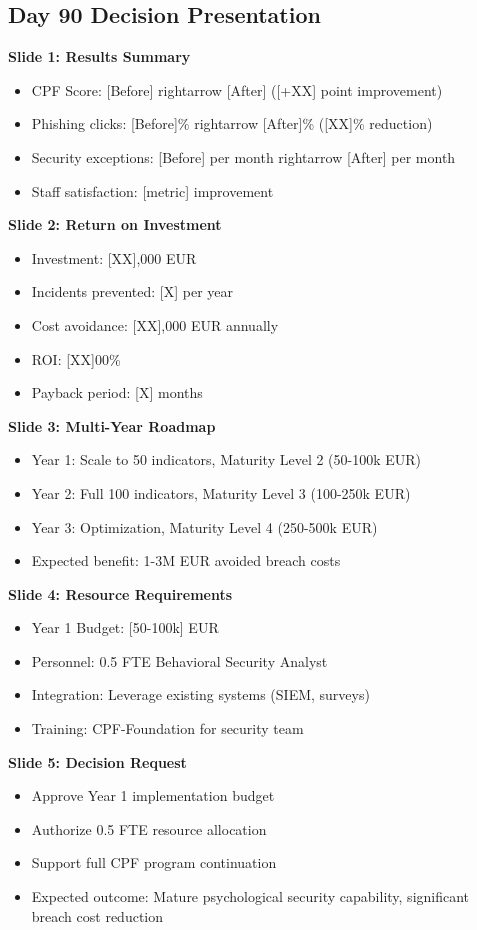 \documentclass[11pt,a4paper]{article}
\begin{document}
\subsection{Day 90 Decision Presentation}

\textbf{Slide 1: Results Summary}
\begin{itemize}
\item CPF Score: [Before] rightarrow [After] ([+XX] point improvement)
\item Phishing clicks: [Before]\% rightarrow [After]\% ([XX]\% reduction)
\item Security exceptions: [Before] per month rightarrow [After] per month
\item Staff satisfaction: [metric] improvement
\end{itemize}

\textbf{Slide 2: Return on Investment}
\begin{itemize}
\item Investment: [XX],000 EUR
\item Incidents prevented: [X] per year
\item Cost avoidance: [XX],000 EUR annually
\item ROI: [XX]00\%
\item Payback period: [X] months
\end{itemize}

\textbf{Slide 3: Multi-Year Roadmap}
\begin{itemize}
\item Year 1: Scale to 50 indicators, Maturity Level 2 (50-100k EUR)
\item Year 2: Full 100 indicators, Maturity Level 3 (100-250k EUR)
\item Year 3: Optimization, Maturity Level 4 (250-500k EUR)
\item Expected benefit: 1-3M EUR avoided breach costs
\end{itemize}

\textbf{Slide 4: Resource Requirements}
\begin{itemize}
\item Year 1 Budget: [50-100k] EUR
\item Personnel: 0.5 FTE Behavioral Security Analyst
\item Integration: Leverage existing systems (SIEM, surveys)
\item Training: CPF-Foundation for security team
\end{itemize}

\textbf{Slide 5: Decision Request}
\begin{itemize}
\item Approve Year 1 implementation budget
\item Authorize 0.5 FTE resource allocation
\item Support full CPF program continuation
\item Expected outcome: Mature psychological security capability, significant breach cost reduction
\end{itemize}
\end{document}
